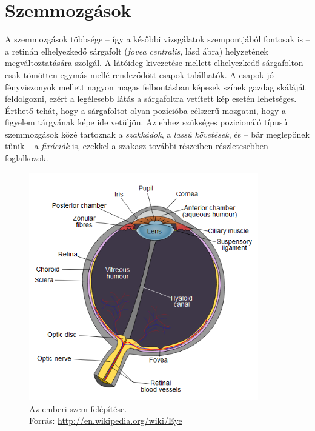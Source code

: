 \section{Szemmozgások}\label{sect:osztalyozas}


A szemmozgások többsége -- így a későbbi vizsgálatok szempontjából fontosak is -- a retinán elhelyezkedő sárgafolt (\emph{fovea centralis}, lásd  ábra) helyzetének megváltoztatására szolgál. A látóideg kivezetése mellett elhelyezkedő sárgafolton csak tömötten egymás mellé rendeződött csapok találhatók. A csapok jó fényviszonyok mellett nagyon magas felbontásban képesek színek gazdag skáláját feldolgozni, ezért a legélesebb látás a sárgafoltra vetített kép esetén lehetséges. Érthető tehát, hogy a sárgafoltot olyan pozícióba célszerű mozgatni, hogy a figyelem tárgyának képe ide vetüljön. Az ehhez szükséges pozicionáló típusú szemmozgások közé tartoznak a \emph{szakkádok}, a \emph{lassú követések}, és -- bár meglepőnek tűnik -- a \emph{fixációk} is, ezekkel a szakasz további részeiben részletesebben foglalkozok.

\begin{figure}[!ht]
\centering
\includegraphics[width=100mm, keepaspectratio]{figures/eye_diagram.png}
\caption{Az emberi szem felépítése.\\Forrás: \url{http://en.wikipedia.org/wiki/Eye}}
\label{fig:eyediag}
\end{figure}

